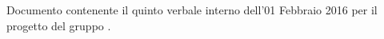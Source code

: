 Documento contenente il quinto verbale interno dell'01 Febbraio 2016 per il progetto \progetto{} del gruppo \gruppo{}.
